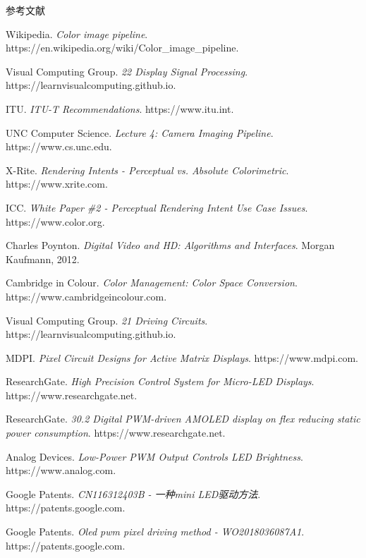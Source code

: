 \documentclass[12pt, a4paper]{ctexart}
\begin{document}
\newpage
{}
\begin{center}
    {\heiti{} 参考文献}
\end{center}
\vspace{1em}
{\songti{}
\begin{enumerate}[label={[\arabic*]}]
    \item Wikipedia. \textit{Color image pipeline}. https://en.wikipedia.org/wiki/Color\_image\_pipeline.
    \item Visual Computing Group. \textit{22 Display Signal Processing}. https://learnvisualcomputing.github.io.
    \item ITU. \textit{ITU-T Recommendations}. https://www.itu.int.
    \item UNC Computer Science. \textit{Lecture 4: Camera Imaging Pipeline}. https://www.cs.unc.edu.
    \item X-Rite. \textit{Rendering Intents - Perceptual vs. Absolute Colorimetric}. https://www.xrite.com.
    \item ICC. \textit{White Paper \#2 - Perceptual Rendering Intent Use Case Issues}. https://www.color.org.
    \item Charles Poynton. \textit{Digital Video and HD: Algorithms and Interfaces}. Morgan Kaufmann, 2012.
    \item Cambridge in Colour. \textit{Color Management: Color Space Conversion}. https://www.cambridgeincolour.com.
    \item Visual Computing Group. \textit{21 Driving Circuits}. https://learnvisualcomputing.github.io.
    \item MDPI. \textit{Pixel Circuit Designs for Active Matrix Displays}. https://www.mdpi.com.
    \item ResearchGate. \textit{High Precision Control System for Micro-LED Displays}. https://www.researchgate.net.
    \item ResearchGate. \textit{30.2 Digital PWM-driven AMOLED display on flex reducing static power consumption}. https://www.researchgate.net.
    \item Analog Devices. \textit{Low-Power PWM Output Controls LED Brightness}. https://www.analog.com.
    \item Google Patents. \textit{CN116312403B - 一种mini LED驱动方法}. https://patents.google.com.
    \item Google Patents. \textit{Oled pwm pixel driving method - WO2018036087A1}. https://patents.google.com.

\end{enumerate}}
\end{document}
